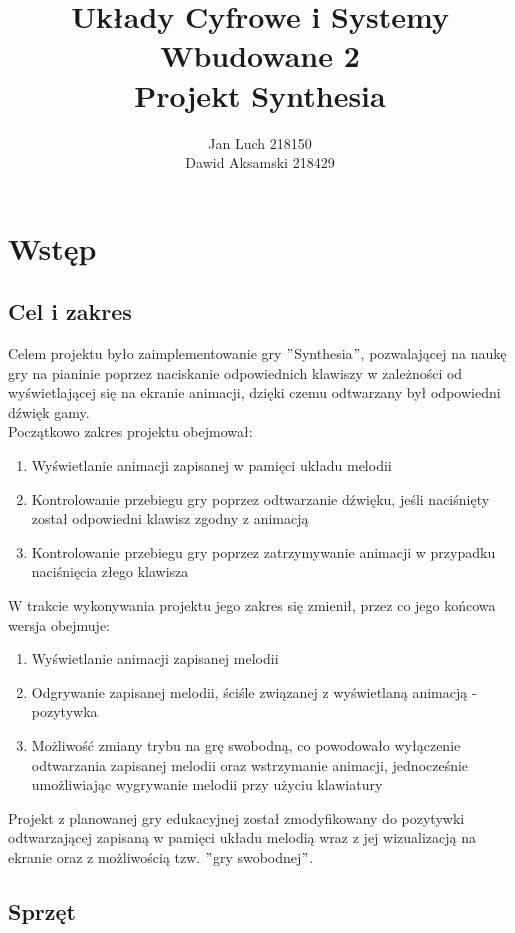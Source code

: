 \documentclass[a4paper]{report}
\title{\huge Układy Cyfrowe i Systemy Wbudowane 2\\Projekt Synthesia}
\date{} %
\author{Jan Luch\hspace{42pt} 218150  \\Dawid Aksamski\hspace{5pt} 218429}
\begin{document}
\frenchspacing
{}
\maketitle
\newpage

\tableofcontents
\newpage


\chapter{Wstęp}
	\section{Cel i zakres}
	Celem projektu było zaimplementowanie gry $"$Synthesia$"$, pozwalającej na naukę gry na pianinie poprzez naciskanie odpowiednich klawiszy w zależności od wyświetlającej się na ekranie animacji, dzięki czemu odtwarzany był odpowiedni dźwięk gamy.\\
	
Początkowo zakres projektu obejmował:
	\begin{enumerate}
	\item Wyświetlanie animacji zapisanej w pamięci układu melodii
	\item Kontrolowanie przebiegu gry poprzez odtwarzanie dźwięku, jeśli naciśnięty został odpowiedni klawisz zgodny z animacją
	\item Kontrolowanie przebiegu gry poprzez zatrzymywanie animacji w przypadku naciśnięcia złego klawisza
	\end{enumerate}
	
W trakcie wykonywania projektu jego zakres się zmienił, przez co jego końcowa wersja obejmuje:
	\begin{enumerate}
	\item Wyświetlanie animacji zapisanej melodii
	\item Odgrywanie zapisanej  melodii, ściśle związanej z wyświetlaną animacją - pozytywka
	\item Możliwość zmiany trybu na grę swobodną, co powodowało wyłączenie odtwarzania zapisanej melodii oraz wstrzymanie animacji, jednocześnie umożliwiając wygrywanie melodii przy użyciu klawiatury
	\end{enumerate}
	
	Projekt z planowanej gry edukacyjnej został zmodyfikowany do pozytywki odtwarzającej zapisaną w pamięci układu melodią wraz z jej wizualizacją na ekranie oraz z możliwością tzw. $"$gry swobodnej$"$.
	\section{Sprzęt}
\end{document}
